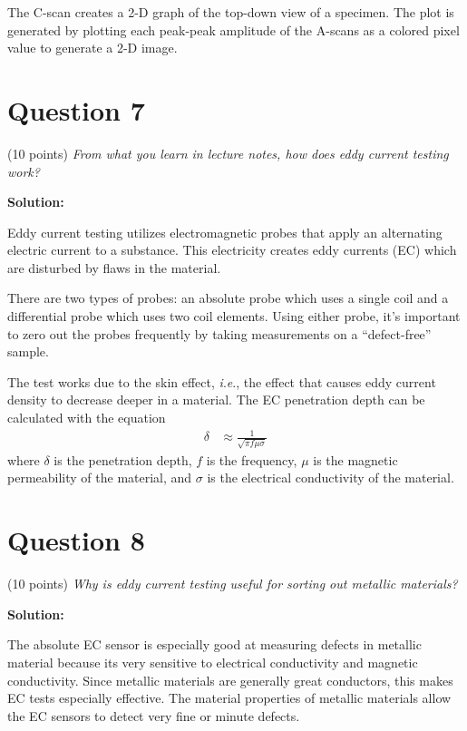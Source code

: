 \documentclass[12 pt]{article}
\newcommand{\ie}{\textit{i}.\textit{e}., }
\begin{document}
The C-scan creates a 2-D graph of the top-down view of a specimen. The plot is generated by plotting each peak-peak amplitude of the A-scans as a colored pixel value to generate a 2-D image.

\section*{Question 7}
(\num{10} points) \textit{From what you learn in lecture notes, how does eddy current testing work?}

\textbf{Solution:}

Eddy current testing utilizes electromagnetic probes that apply an alternating electric current to a substance. This electricity creates eddy currents (EC) which are disturbed by flaws in the material.

There are two types of probes: an absolute probe which uses a single coil and a differential probe which uses two coil elements. Using either probe, it's important to zero out the probes frequently by taking measurements on a ``defect-free'' sample.

The test works due to the skin effect, \ie the effect that causes eddy current density to decrease deeper in a material. The EC penetration depth can be calculated with the equation
\begin{align}
	\delta&\approx\frac{1}{\sqrt{\pi{}f\mu\sigma}}
\end{align}
where $\delta$ is the penetration depth, $f$ is the frequency, $\mu$ is the magnetic permeability of the material, and $\sigma$ is the electrical conductivity of the material.

\section*{Question 8}
(\num{10} points) \textit{Why is eddy current testing useful for sorting out metallic materials?}

\textbf{Solution:}

The absolute EC sensor is especially good at measuring defects in metallic material because its very sensitive to electrical conductivity and magnetic conductivity. Since metallic materials are generally great conductors, this makes EC tests especially effective. The material properties of metallic materials allow the EC sensors to detect very fine or minute defects.
\end{document}
